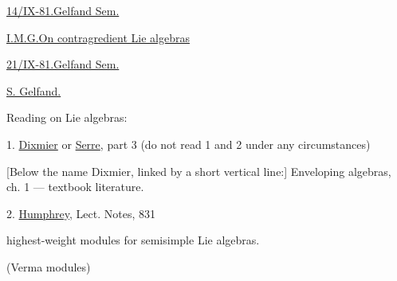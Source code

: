 \underline{14/IX-81.}\qquad \underline{Gelfand Sem.}

\underline{I.M.G.}\quad \underline{On contragredient Lie algebras}

\underline{21/IX-81.}\qquad \underline{Gelfand Sem.}

\underline{S. Gelfand.}

Reading on Lie algebras:

1. \underline{Dixmier} or \underline{Serre}, part 3 (do not read 1 and 2 under any circumstances)

[Below the name Dixmier, linked by a short vertical line:] Enveloping algebras, ch. 1 --- textbook literature.

2. \underline{Humphrey}, Lect. Notes, 831

highest-weight modules for semisimple Lie algebras.

(Verma modules)

